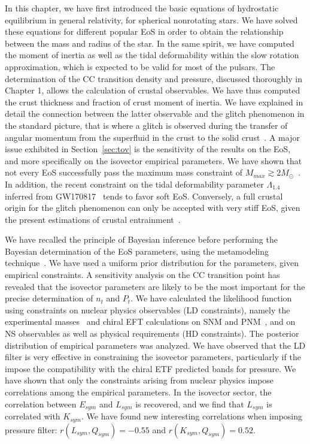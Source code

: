 In this chapter, we have first introduced the basic equations of hydrostatic 
equilibrium in general relativity, for spherical nonrotating stars. We have
solved these equations for different popular EoS in order to obtain the
relationship between the mass and radius of the star. In the same spirit, we
have computed the moment of inertia as well as the tidal deformability within
the slow rotation approximation, which is expected to be valid for most of the 
pulsars. The determination of the CC transition density and pressure, discussed
thoroughly in Chapter 1, allows the calculation of crustal observables. We have 
thus computed the crust thickness and fraction of crust moment of inertia. We
have explained in detail the connection between the latter observable and the 
glitch phenomenon in the standard picture, that is where a glitch is observed 
during the transfer of angular momentum from the superfluid in the crust to the 
solid crust~\cite{Anderson1975}. 
A major issue exhibited in Section~\ref{sec:tov} is the sensitivity of
the results on the EoS, and more specifically on the isovector empirical
parameters. We have shown that not every EoS successfully pass the maximum mass
constraint of $M_{max} \gtrsim
2M_\odot$~\cite{Demorest2010,Antoniadis2013,Cromartie2020}. In addition, the
recent constraint on the tidal deformability parameter $\Lambda_{1.4}$ inferred 
from GW170817~\cite{GW1} tends to favor soft EoS. Conversely, a full crustal 
origin for the glitch phenomenon can only be accepted with very stiff EoS, 
given the present estimations of crustal 
entrainment~\cite{Andersson2012,Piekarewicz2014}.

We have recalled the principle of Bayesian inference before performing the
Bayesian determination of the EoS parameters, using the metamodeling
technique~\cite{Margueron2018a}. We have used a uniform prior distribution for
the parameters, given empirical constraints. A sensitivity analysis on the CC
transition point has revealed that the isovector parameters are likely to be
the most important for the precise determination of $n_t$ and $P_t$.
We have calculated the likelihood function using constraints on nuclear physics
observables (LD constraints), namely the experimental masses~\cite{Huang2017} 
and chiral EFT calculations on SNM and PNM~\cite{Drischler2016}, and on NS
observables as well as physical requirements (HD constraints). The posterior
distribution of empirical parameters was analyzed. We have observed that the
LD filter is very effective in constraining the isovector parameters,
particularly if the impose the compatibility with the chiral ETF predicted
bands for pressure. We have shown that only the constraints arising from
nuclear physics impose correlations among the empirical parameters. In the
isovector sector, the correlation between $E_{sym}$ and $L_{sym}$ is recovered,
and we find that $L_{sym}$ is correlated with $K_{sym}$. We have found
new interesting correlations when imposing pressure filter:
$r(L_{sym},Q_{sym})=-0.55$ and $r(K_{sym},Q_{sym})=0.52$.

